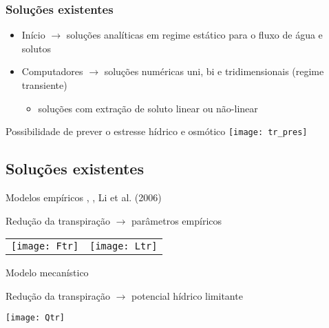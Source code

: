 \begin{frame}\frametitle{Soluções existentes}
    \begin{itemize}
    \item Início $\rightarrow$ soluções analíticas em regime estático para o fluxo de água e solutos
    \item Computadores $\rightarrow$ soluções numéricas uni, bi e tridimensionais (regime transiente)
      \begin{itemize}
	\item soluções com extração de soluto linear ou não-linear
      \end{itemize}
  \end{itemize}
  \centering
  Possibilidade de prever o estresse hídrico e osmótico
  \texttt{[image: tr\_pres]}\\
\end{frame}

\subsection{Soluções existentes}
\scriptsize
\begin{frame}
  \begin{block}{Modelos empíricos}
    \cite{feddes78}, \cite{homaee}, Li et al. (2006)

    Redução da transpiração $\rightarrow$ parâmetros empíricos

    \centering
    \begin{tabular}{cc}
      \texttt{[image: Ftr]} &
      \texttt{[image: Ltr]} \\
    \end{tabular}
  \end{block}
  
  \begin{block}{Modelo mecanístico}
    \cite{liersolute}

    Redução da transpiração $\rightarrow$ potencial hídrico limitante
    
    \centering
    \texttt{[image: Qtr]}
  \end{block}
\end{frame}


